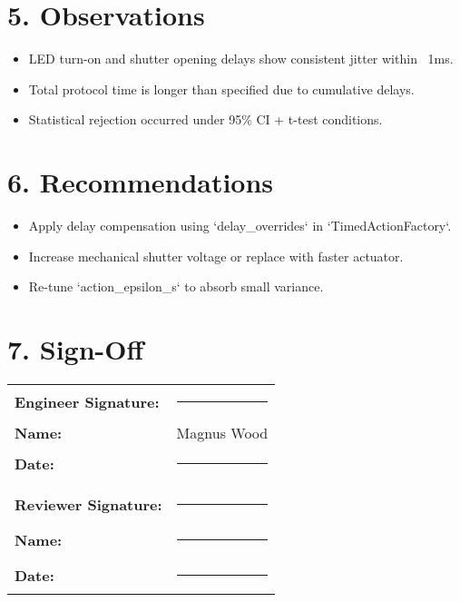 \documentclass[11pt]{article}
\begin{document}
\section*{5. Observations}
\begin{itemize}
  \item LED turn-on and shutter opening delays show consistent jitter within ~1ms.
  \item Total protocol time is longer than specified due to cumulative delays.
  \item Statistical rejection occurred under 95\% CI + t-test conditions.
\end{itemize}

\section*{6. Recommendations}
\begin{itemize}
  \item Apply delay compensation using `delay_overrides` in `TimedActionFactory`.
  \item Increase mechanical shutter voltage or replace with faster actuator.
  \item Re-tune `action_epsilon_s` to absorb small variance.
\end{itemize}

\section*{7. Sign-Off}
\vspace{1em}
\noindent
\begin{tabular}{ll}
\textbf{Engineer Signature:} & \rule{5cm}{0.4pt} \\
\textbf{Name:} & Magnus Wood \\
\textbf{Date:} & \rule{4cm}{0.4pt} \\
\\
\textbf{Reviewer Signature:} & \rule{5cm}{0.4pt} \\
\textbf{Name:} & \rule{5cm}{0.4pt} \\
\textbf{Date:} & \rule{4cm}{0.4pt} \\
\end{tabular}
\end{document}
